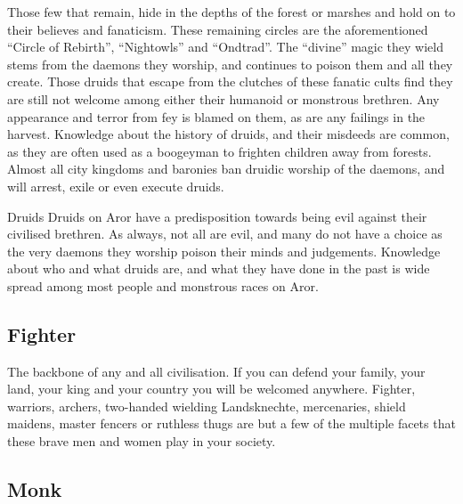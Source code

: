 Those few that remain, hide in the depths of the forest or marshes and hold on
to their believes and fanaticism. These remaining circles are the aforementioned
``Circle of Rebirth'', ``Nightowls'' and ``Ondtrad''. The ``divine'' magic they
wield stems from the daemons they worship, and continues to poison them and all
they create. Those druids that escape from the clutches of these fanatic cults
find they are still not welcome among either their humanoid or monstrous
brethren. Any appearance and terror from fey is blamed on them, as are any
failings in the harvest. Knowledge about the history of druids, and their
misdeeds are common, as they are often used as a boogeyman to frighten
children away from forests. Almost all city kingdoms and baronies ban druidic
worship of the daemons, and will arrest, exile or even execute druids.


\begin{35e}{Druids}
  Druids on Aror have a predisposition towards being evil against their
  civilised brethren. As always, not all are evil, and many do not have a
  choice as the very daemons they worship poison their minds and judgements.
  Knowledge about who and what druids are, and what they have done in the
  past is wide spread among most people and monstrous races on Aror.
\end{35e}

\subsection{Fighter}
\label{sec:Fighter}

The backbone of any and all civilisation. If you can defend your family, your
land, your king and your country you will be welcomed anywhere. Fighter,
warriors, archers, two-handed wielding Landsknechte, mercenaries, shield
maidens, master fencers or ruthless thugs are but a few of the multiple
facets that these brave men and women play in your society.


\subsection{Monk}
\label{sec:Monk}

